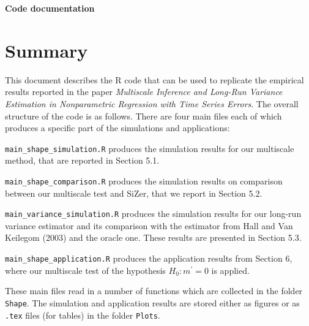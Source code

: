 \documentclass[a4paper,12pt]{article}
\begin{document}
\begin{center}
{\LARGE \bf Code documentation}
\end{center}
\vspace{0.5cm}



\section*{Summary}


\setlength{\parskip}{0.2cm} 
This document describes the R code that can be used to replicate the empirical results reported in the paper \textit{Multiscale Inference and Long-Run Variance Estimation in Nonparametric Regression with Time Series Errors}. The overall structure of the code is as follows. There are four main files each of which produces a specific part of the simulations and applications:
\vspace{0.2cm}

\everypar{\hangafter=1\hangindent=1.45cm\relax}
\verb|main_shape_simulation.R| \hspace{1pt} produces the simulation results for our multiscale \linebreak method, that are reported in Section 5.1.

\verb|main_shape_comparison.R| \hspace{1pt} produces the simulation results on comparison between our multiscale test and SiZer, that we report in Section 5.2.

\verb|main_variance_simulation.R| \hspace{1pt} produces the simulation results for our long-run variance estimator and its comparison with the estimator from Hall and Van Keilegom (2003) and the oracle one. These results are presented in Section 5.3.

\verb|main_shape_application.R| \hspace{1pt} produces the application results from Section 6, where our multiscale test of the hypothesis $H_0: m^\prime = 0$ is applied.


\everypar{\hangafter=0\relax}
These main files read in a number of functions which are collected in the folder \verb|Shape|. The simulation and application results are stored either as figures or as \verb|.tex| files (for tables) in the folder \verb|Plots|. 
\vspace{0.2cm}
\end{document}
